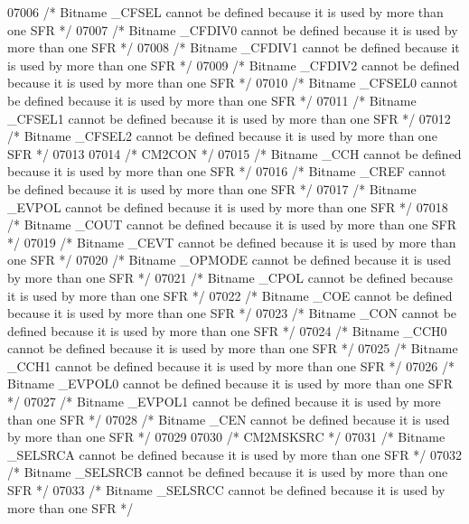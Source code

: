 \begin{DoxyCode}
07006 \textcolor{comment}{/* Bitname \_CFSEL cannot be defined because it is used by more than one SFR */}
07007 \textcolor{comment}{/* Bitname \_CFDIV0 cannot be defined because it is used by more than one SFR */}
07008 \textcolor{comment}{/* Bitname \_CFDIV1 cannot be defined because it is used by more than one SFR */}
07009 \textcolor{comment}{/* Bitname \_CFDIV2 cannot be defined because it is used by more than one SFR */}
07010 \textcolor{comment}{/* Bitname \_CFSEL0 cannot be defined because it is used by more than one SFR */}
07011 \textcolor{comment}{/* Bitname \_CFSEL1 cannot be defined because it is used by more than one SFR */}
07012 \textcolor{comment}{/* Bitname \_CFSEL2 cannot be defined because it is used by more than one SFR */}
07013 
07014 \textcolor{comment}{/* CM2CON */}
07015 \textcolor{comment}{/* Bitname \_CCH cannot be defined because it is used by more than one SFR */}
07016 \textcolor{comment}{/* Bitname \_CREF cannot be defined because it is used by more than one SFR */}
07017 \textcolor{comment}{/* Bitname \_EVPOL cannot be defined because it is used by more than one SFR */}
07018 \textcolor{comment}{/* Bitname \_COUT cannot be defined because it is used by more than one SFR */}
07019 \textcolor{comment}{/* Bitname \_CEVT cannot be defined because it is used by more than one SFR */}
07020 \textcolor{comment}{/* Bitname \_OPMODE cannot be defined because it is used by more than one SFR */}
07021 \textcolor{comment}{/* Bitname \_CPOL cannot be defined because it is used by more than one SFR */}
07022 \textcolor{comment}{/* Bitname \_COE cannot be defined because it is used by more than one SFR */}
07023 \textcolor{comment}{/* Bitname \_CON cannot be defined because it is used by more than one SFR */}
07024 \textcolor{comment}{/* Bitname \_CCH0 cannot be defined because it is used by more than one SFR */}
07025 \textcolor{comment}{/* Bitname \_CCH1 cannot be defined because it is used by more than one SFR */}
07026 \textcolor{comment}{/* Bitname \_EVPOL0 cannot be defined because it is used by more than one SFR */}
07027 \textcolor{comment}{/* Bitname \_EVPOL1 cannot be defined because it is used by more than one SFR */}
07028 \textcolor{comment}{/* Bitname \_CEN cannot be defined because it is used by more than one SFR */}
07029 
07030 \textcolor{comment}{/* CM2MSKSRC */}
07031 \textcolor{comment}{/* Bitname \_SELSRCA cannot be defined because it is used by more than one SFR */}
07032 \textcolor{comment}{/* Bitname \_SELSRCB cannot be defined because it is used by more than one SFR */}
07033 \textcolor{comment}{/* Bitname \_SELSRCC cannot be defined because it is used by more than one SFR */}

\end{DoxyCode}
